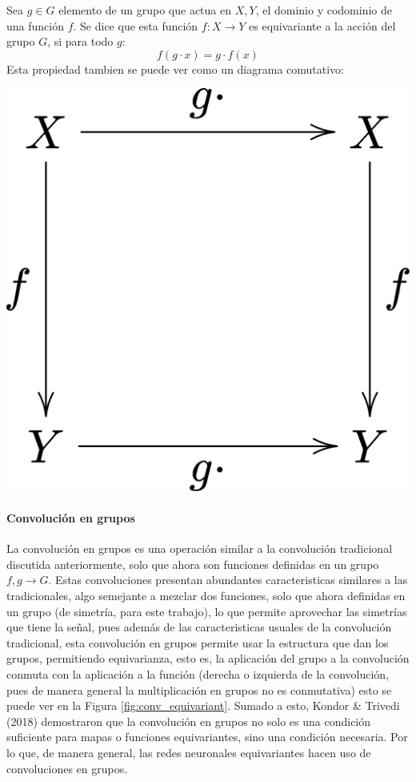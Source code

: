 \documentclass[12pt,letterpaper,final, openany]{scrbook}
\begin{document}
Sea $g \in G$ elemento de un grupo que actua en $X,Y$, el dominio y codominio de una función $f$. Se dice que esta función $f \colon  X \to Y $ es equivariante a la acción del grupo $G$, si para todo $g$:
\begin{equation}
f(g \cdot x)=g \cdot f(x)
\end{equation}
Esta propiedad tambien se puede ver como un diagrama comutativo:
\begin{center}
\includegraphics[scale=0.1]{equivariance_diagram.png}
\end{center}
\paragraph{Convolución en grupos}
La convolución en grupos es una operación similar a la convolución tradicional discutida anteriormente, solo que ahora son funciones definidas en un grupo $f,g \rightarrow G$. Estas convoluciones presentan abundantes caracteristicas similares a las tradicionales, algo semejante a mezclar dos funciones, solo que ahora definidas en un grupo (de simetría, para este trabajo), lo que permite aprovechar las simetrías que tiene la señal, pues además de las caracteristicas usuales de la convolución tradicional, esta convolución en grupos permite usar la estructura que dan los grupos, permitiendo equivarianza, esto es, la aplicación del grupo a la convolución conmuta con la aplicación a la función (derecha o izquierda de la convolución, pues de manera general la multiplicación en grupos no es conmutativa) esto se puede ver en la Figura \ref{fig:conv_equivariant}. Sumado a esto, Kondor \& Trivedi (2018) demostraron que la convolución en grupos no solo es una condición suficiente para mapas o funciones equivariantes, sino una condición necesaria. Por lo que, de manera general, las redes neuronales equivariantes hacen uso de convoluciones en grupos.
\end{document}
